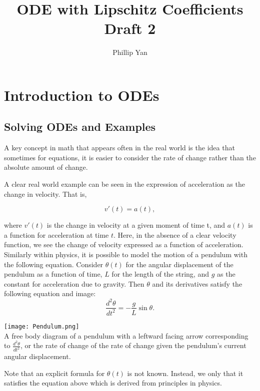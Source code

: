 \documentclass{article}
\date{}
\title{ODE with Lipschitz Coefficients Draft 2}
\author{Phillip Yan}
\theoremstyle{remark}
\begin{document}
\maketitle



\section{Introduction to ODEs}

\subsection{Solving ODEs and Examples}

A key concept in math that appears often in the real world is the idea that sometimes for equations, it is easier to consider the rate of change rather than the absolute amount of change.

A clear real world example can be seen in the expression of acceleration as the change in velocity. That is, 

$$v'(t) = a(t),$$

\noindent where $v'(t)$ is the change in velocity at a given moment of time t, and $a(t)$ is a function for acceleration at time $t$. Here, in the absence of a clear velocity function, we see the change of velocity expressed as a function of acceleration. Similarly within physics, it is possible to model the motion of a pendulum with the following equation.
Consider $\theta(t)$ for the angular displacement of the pendulum as a function of time, $L$ for the length of the string, and $g$ as the constant for acceleration due to gravity. Then $\theta$ and its derivatives satisfy the following equation and image: \\


$$\frac{d^2\theta}{dt^2}  = - \frac{g}{L}\sin{\theta}.$$

\begin{center}\texttt{[image: Pendulum.png]} \\ A free body diagram of a pendulum with a leftward facing  arrow corresponding to $\frac{d^2\theta}{dt^2}$, or the rate of change of the rate of change given the pendulum's current angular displacement. \end{center}

Note that an explicit formula for $\theta(t)$ is not known. Instead, we only that it satisfies the equation above which is derived from principles in physics.
\end{document}
